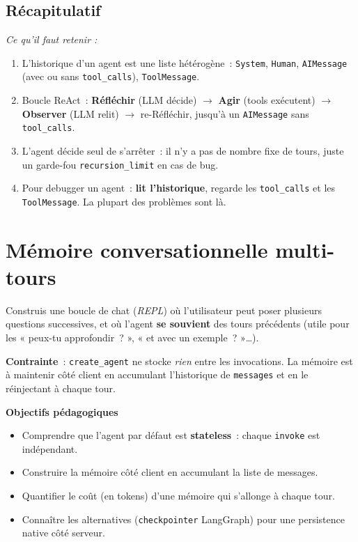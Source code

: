 \documentclass[11pt,a4paper]{article}
\begin{document}
\subsection*{Récapitulatif}
{\itshape\sloppy
\textit{Ce qu'il faut retenir :}
\begin{enumerate}[leftmargin=*]
  \item L'historique d'un agent est une liste hétérogène~:
        \texttt{System}, \texttt{Human}, \texttt{AIMessage} (avec ou
        sans \texttt{tool\_calls}), \texttt{ToolMessage}.
  \item Boucle ReAct~: \textbf{Réfléchir} (LLM décide) $\to$
        \textbf{Agir} (tools exécutent) $\to$ \textbf{Observer} (LLM
        relit) $\to$ re-Réfléchir, jusqu'à un \texttt{AIMessage} sans
        \texttt{tool\_calls}.
  \item L'agent décide seul de s'arrêter~: il n'y a pas de nombre fixe
        de tours, juste un garde-fou \texttt{recursion\_limit} en cas de
        bug.
  \item Pour debugger un agent~: \textbf{lit l'historique}, regarde les
        \texttt{tool\_calls} et les \texttt{ToolMessage}. La plupart des
        problèmes sont là.
\end{enumerate}
\par}

\section{Mémoire conversationnelle multi-tours}

\begin{tcolorbox}[title=Exercice 4. Un chat où l'agent se souvient des tours précédents]
Construis une boucle de chat (\emph{REPL}) où l'utilisateur peut poser
plusieurs questions successives, et où l'agent \textbf{se souvient} des
tours précédents (utile pour les « peux-tu approfondir~? », « et avec
un exemple~? »\dots).

\textbf{Contrainte}~: \texttt{create\_agent} ne stocke \emph{rien} entre
les invocations. La mémoire est à maintenir côté client en accumulant
l'historique de \texttt{messages} et en le réinjectant à chaque tour.

\bigskip
\noindent\textbf{Objectifs pédagogiques}
\begin{itemize}[leftmargin=*]
  \item Comprendre que l'agent par défaut est \textbf{stateless}~: chaque
        \texttt{invoke} est indépendant.
  \item Construire la mémoire côté client en accumulant la liste de
        messages.
  \item Quantifier le coût (en tokens) d'une mémoire qui s'allonge à
        chaque tour.
  \item Connaître les alternatives (\texttt{checkpointer} LangGraph) pour
        une persistence native côté serveur.
\end{itemize}
\end{tcolorbox}
\end{document}
